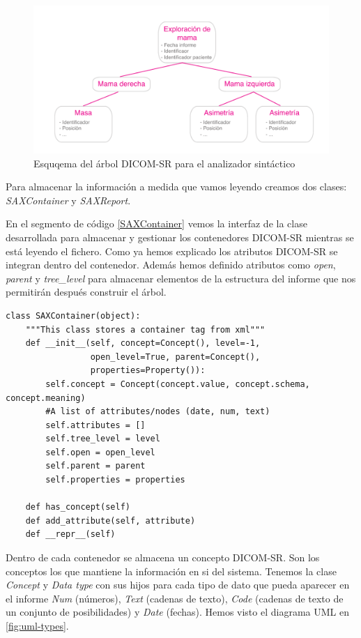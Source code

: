 \begin{figure}[ht]
\centering
\includegraphics[scale=0.7]{./imgs/esquemas/dicomsrTreeSAX.pdf}
\caption{Esquqema del árbol DICOM-SR para el analizador sintáctico}
\label{fig:SAXReport_schema}
\end{figure}


Para almacenar la información a medida que vamos leyendo creamos dos clases: \emph{SAXContainer} y \emph{SAXReport}.\par
En el segmento de código \ref{SAXContainer} vemos la interfaz de la clase desarrollada para almacenar y gestionar los contenedores DICOM-SR mientras se está leyendo el fichero. Como ya hemos explicado los atributos DICOM-SR se integran dentro del contenedor. Además hemos definido atributos como \emph{open}, \emph{parent} y \emph{tree\_level} para almacenar elementos de la estructura del informe que nos permitirán después construir el árbol.\par

\begin{lstlisting}[label=SAXContainer,caption=Clase que almacena información durante el análisis de un contenedor]
class SAXContainer(object):
    """This class stores a container tag from xml"""
    def __init__(self, concept=Concept(), level=-1, 
    			 open_level=True, parent=Concept(),
    			 properties=Property()):
        self.concept = Concept(concept.value, concept.schema, concept.meaning)
        #A list of attributes/nodes (date, num, text)
        self.attributes = []
        self.tree_level = level
        self.open = open_level
        self.parent = parent
        self.properties = properties

    def has_concept(self)
    def add_attribute(self, attribute)
	def __repr__(self)
\end{lstlisting}

Dentro de cada contenedor se almacena un concepto DICOM-SR. Son los conceptos los que mantiene la información en si del sistema. Tenemos la clase \emph{Concept} y \emph{Data type} con sus hijos para cada tipo de dato que pueda aparecer en el informe \emph{Num} (números), \emph{Text} (cadenas de texto), \emph{Code} (cadenas de texto de un conjunto de posibilidades) y \emph{Date} (fechas). Hemos visto el diagrama UML en \ref{fig:uml-types}.\medskip\par


